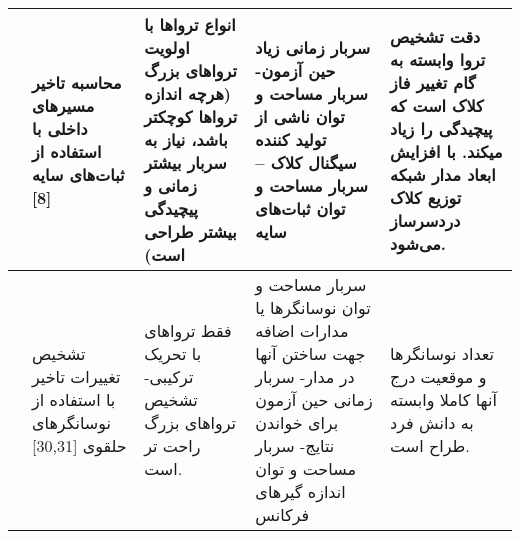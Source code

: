 \begin{table}
\begin{tabular}{|p{1cm}||p{3cm}|p{3cm}|p{3cm}|p{3cm}|}
		&محاسبه تاخیر مسیرهای داخلی با استفاده از ثبات‌های سایه [8]  &انواع تروا‌ها با اولویت تروا‌های بزرگ (هرچه اندازه تروا‌ها کوچکتر باشد، نیاز به سربار بیشتر زمانی و پیچیدگی بیشتر طراحی است) &سربار زمانی زیاد حین آزمون- سربار مساحت و توان ناشی از تولید کننده سیگنال کلاک – سربار مساحت و توان ثبات‌های سایه &دقت تشخیص تروا وابسته به گام تغییر فاز کلاک است که پیچیدگی را زیاد می­کند. با افزایش ابعاد مدار شبکه توزیع کلاک دردسرساز می‌شود.
		\\ \hline \hline
		&تشخیص تغییرات تاخیر با استفاده از نوسانگرهای حلقوی [30,31]&فقط تروا‌های با تحریک ترکیبی- تشخیص تروا‌های بزرگ راحت تر است.&سربار مساحت و توان نوسانگرها یا مدارات اضافه جهت ساختن آنها در مدار-  سربار زمانی حین آزمون برای خواندن نتایج- سربار مساحت و توان اندازه گیرهای فرکانس&تعداد نوسانگرها و موقعیت درج آنها کاملا وابسته به دانش فرد طراح است.
		\\ \hline
	\end{tabular}
	
\end{table}

